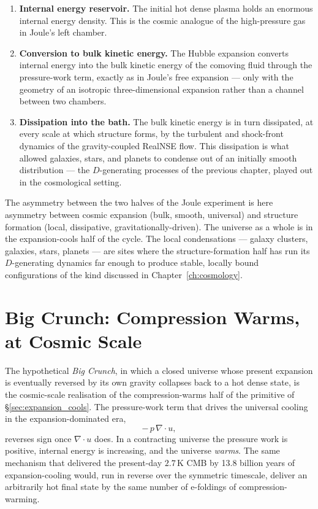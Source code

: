 \begin{enumerate}
\item \textbf{Internal energy reservoir.} The initial hot dense plasma
holds an enormous internal energy density. This is the cosmic
analogue of the high-pressure gas in Joule's left chamber.

\item \textbf{Conversion to bulk kinetic energy.} The Hubble expansion
converts internal energy into the bulk kinetic energy of the comoving
fluid through the pressure-work term, exactly as in Joule's free
expansion --- only with the geometry of an isotropic three-dimensional
expansion rather than a channel between two chambers.

\item \textbf{Dissipation into the bath.} The bulk kinetic energy is
in turn dissipated, at every scale at which structure forms, by the
turbulent and shock-front dynamics of the gravity-coupled RealNSE flow.
This dissipation is what allowed galaxies, stars, and planets to
condense out of an initially smooth distribution --- the
$D$-generating processes of the previous chapter, played out in the
cosmological setting.
\end{enumerate}

The asymmetry between the two halves of the Joule experiment is here
asymmetry between cosmic expansion (bulk, smooth, universal) and
structure formation (local, dissipative, gravitationally-driven). The
universe as a whole is in the expansion-cools half of the cycle. The
local condensations --- galaxy clusters, galaxies, stars, planets ---
are sites where the structure-formation half has run its
$D$-generating dynamics far enough to produce stable, locally bound
configurations of the kind discussed in Chapter~\ref{ch:cosmology}.

\section{Big Crunch: Compression Warms, at Cosmic Scale}

The hypothetical \emph{Big Crunch}, in which a closed universe whose
present expansion is eventually reversed by its own gravity collapses
back to a hot dense state, is the cosmic-scale realisation of the
compression-warms half of the primitive of
\S\ref{sec:expansion_cools}. The pressure-work term that drives the
universal cooling in the expansion-dominated era,
\[
  -\,p\,\nabla\!\cdot u,
\]
reverses sign once $\nabla\!\cdot u$ does. In a contracting universe
the pressure work is positive, internal energy is increasing, and the
universe \emph{warms}. The same mechanism that delivered the
present-day $2.7\,\mathrm{K}$ CMB by 13.8 billion years of
expansion-cooling would, run in reverse over the symmetric
timescale, deliver an arbitrarily hot final state by the same number
of e-foldings of compression-warming.

